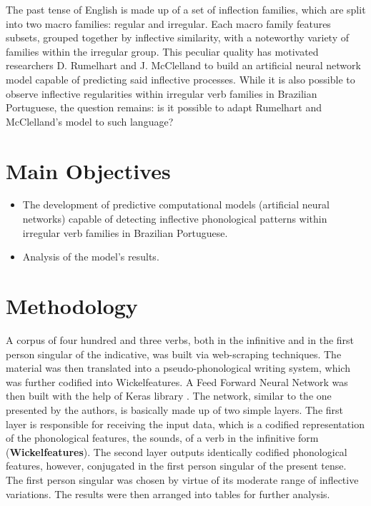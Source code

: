\documentclass[a0,portrait]{a0poster}
\begin{document}
\begin{multicols}{2}
{The past tense of English is made up of a set of inflection families, which are split into two macro families: regular and irregular. Each macro family features subsets, grouped together by inflective similarity, with a noteworthy variety of families within the irregular group. This peculiar quality has motivated researchers D. Rumelhart and J. McClelland to build an artificial neural network model capable of predicting said inflective processes. While it is also possible to observe inflective regularities within irregular verb families in Brazilian Portuguese, the question remains: is it possible to adapt Rumelhart and McClelland's model to such language?   
}


\color{DB} %

\section*{Main Objectives}

\color{darkgray}

\begin{itemize}
\item \large{The development of predictive computational  models (artificial neural networks) capable of detecting inflective phonological patterns within irregular verb families in Brazilian Portuguese.}
\item \large{Analysis of the model's results.}
\end{itemize} 
\color{DB}
\section*{Methodology}
\color{darkgray}
A corpus of four hundred and three verbs, both in the infinitive and in the first person singular of the indicative, was built via web-scraping techniques. The material was then translated into a pseudo-phonological writing system, which was further codified into Wickelfeatures. A Feed Forward Neural Network was then built with the help of Keras library \cite{chollet2015keras}.
The network, similar to the one presented by the authors, is basically made up of two simple layers. The first layer is responsible for receiving the input data, which is a codified representation of the phonological features, the sounds, of a verb in the infinitive form (\textbf{Wickelfeatures})\cite{rumelhart:1986}. The second layer outputs identically codified phonological features, however, conjugated in the first person singular of the present tense. The first person singular was chosen by virtue of its moderate range of inflective variations. The results were then arranged into tables for further analysis. 


\end{multicols}
\end{document}
